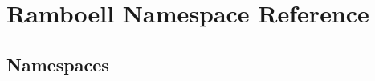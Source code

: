 \hypertarget{namespace_ramboell}{}\section{Ramboell Namespace Reference}
\label{namespace_ramboell}
\subsection*{Namespaces}
\begin{DoxyCompactItemize}
\end{DoxyCompactItemize}
